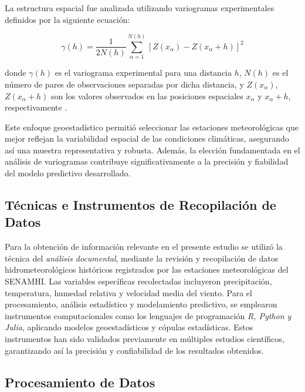 La estructura espacial fue analizada utilizando variogramas experimentales definidos por la siguiente ecuación:

\begin{equation}
\gamma(h) = \frac{1}{2N(h)} \sum_{\alpha=1}^{N(h)} [Z(x_{\alpha}) - Z(x_{\alpha}+h)]^2
\end{equation}

donde \(\gamma(h)\) es el variograma experimental para una distancia \(h\), \(N(h)\) es el número de pares de observaciones separadas por dicha distancia, y \(Z(x_{\alpha})\), \(Z(x_{\alpha}+h)\) son los valores observados en las posiciones espaciales \(x_{\alpha}\) y \(x_{\alpha}+h\), respectivamente \parencite{VerHoef2002}.

Este enfoque geoestadístico permitió seleccionar las estaciones meteorológicas que mejor reflejan la variabilidad espacial de las condiciones climáticas, asegurando así una muestra representativa y robusta. Además, la elección fundamentada en el análisis de variogramas contribuye significativamente a la precisión y fiabilidad del modelo predictivo desarrollado.




\subsection{Técnicas e Instrumentos de Recopilación de Datos}
Para la obtención de información relevante en el presente estudio se utilizó la técnica del \textit{análisis documental}, mediante la revisión y recopilación de datos hidrometeorológicos históricos registrados por las estaciones meteorológicas del SENAMHI. Las variables específicas recolectadas incluyeron precipitación, temperatura, humedad relativa y velocidad media del viento. Para el procesamiento, análisis estadístico y modelamiento predictivo, se emplearon instrumentos computacionales como los lenguajes de programación \textit{R, Python y Julia}, aplicando modelos geoestadísticos y cópulas estadísticas. Estos instrumentos han sido validados previamente en múltiples estudios científicos, garantizando así la precisión y confiabilidad de los resultados obtenidos.


\subsection{Procesamiento de Datos}

